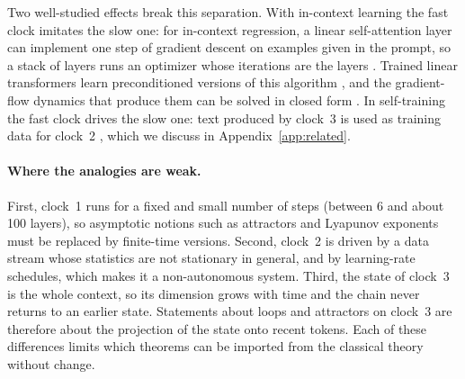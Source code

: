 Two well-studied effects break this separation. With in-context learning the fast clock imitates the slow one: for in-context regression, a linear self-attention layer can implement one step of gradient descent on examples given in the prompt, so a stack of layers runs an optimizer whose iterations are the layers \citep{oswald2022transformers,akyurek2022learning,garg2022transformers}. Trained linear transformers learn preconditioned versions of this algorithm \citep{ahn2023transformers}, and the gradient-flow dynamics that produce them can be solved in closed form \citep{zhang2023trained}. In self-training the fast clock drives the slow one: text produced by clock~3 is used as training data for clock~2 \citep{shumailov2023curse,bertrand2023stability}, which we discuss in Appendix~\ref{app:related}.

\paragraph{Where the analogies are weak.} First, clock~1 runs for a fixed and small number of steps (between 6 and about 100 layers), so asymptotic notions such as attractors and Lyapunov exponents must be replaced by finite-time versions. Second, clock~2 is driven by a data stream whose statistics are not stationary in general, and by learning-rate schedules, which makes it a non-autonomous system. Third, the state of clock~3 is the whole context, so its dimension grows with time and the chain never returns to an earlier state. Statements about loops and attractors on clock~3 are therefore about the projection of the state onto recent tokens. Each of these differences limits which theorems can be imported from the classical theory without change.
